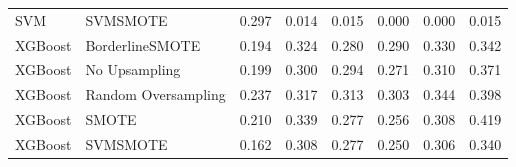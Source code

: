 \begin{tabular}{llllllll}
                            SVM &                      SVMSMOTE & 0.297 &                     0.014 &                 0.015 &                  0.000 &                                   0.000 &     0.015 \\
                        XGBoost &               BorderlineSMOTE & 0.194 &                     0.324 &                 0.280 &                  0.290 &                                   0.330 &     0.342 \\
                        XGBoost &                 No Upsampling & 0.199 &                     0.300 &                 0.294 &                  0.271 &                                   0.310 &     0.371 \\
                        XGBoost &           Random Oversampling & 0.237 &                     0.317 &                 0.313 &                  0.303 &                                   0.344 &     0.398 \\
                        XGBoost &                         SMOTE & 0.210 &                     0.339 &                 0.277 &                  0.256 &                                   0.308 &     0.419 \\
                        XGBoost &                      SVMSMOTE & 0.162 &                     0.308 &                 0.277 &                  0.250 &                                   0.306 &     0.340 \\
\bottomrule
\end{tabular}
